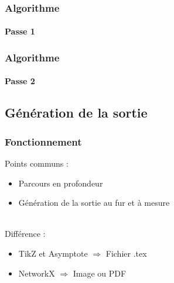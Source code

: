 \begin{frame}[allowframebreaks]
	\frametitle{Algorithme}
	\framesubtitle{Passe 1}
	
\end{frame}

\begin{frame}[allowframebreaks]
	\frametitle{Algorithme}
	\framesubtitle{Passe 2}
	
\end{frame}

\subsection{Génération de la sortie}

\begin{frame}
	\frametitle{Fonctionnement}
	Points communs :
	\begin{itemize}
		\item Parcours en profondeur
		\item Génération de la sortie au fur et à mesure	
	\end{itemize}
	~\\
	Différence :
	\begin{itemize}
		\item TikZ et Asymptote $\Rightarrow$ Fichier .tex
		\item NetworkX $\Rightarrow$ Image ou PDF	
	\end{itemize}
\end{frame}


%    

